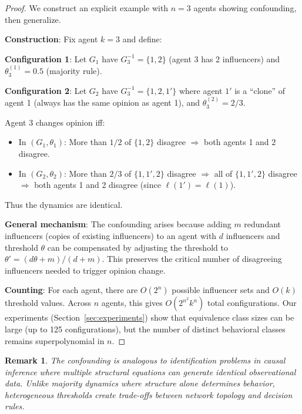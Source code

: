 \documentclass[11pt]{article}
\newtheorem{remark}{Remark}
\begin{document}
\begin{proof}
We construct an explicit example with $n=3$ agents showing confounding, then generalize.

\textbf{Construction}: Fix agent $k=3$ and define:

\textbf{Configuration 1}: Let $G_1$ have $G_{3}^{-1} = \{1,2\}$ (agent 3 has 2 influencers) and $\theta_3^{(1)} = 0.5$ (majority rule).

\textbf{Configuration 2}: Let $G_2$ have $G_{3}^{-1} = \{1,2,1'\}$ where agent $1'$ is a ``clone'' of agent 1 (always has the same opinion as agent 1), and $\theta_3^{(2)} = 2/3$.

Agent 3 changes opinion iff:
\begin{itemize}
\item In $(G_1, \theta_1)$: More than $1/2$ of $\{1,2\}$ disagree $\Rightarrow$ both agents 1 and 2 disagree.
\item In $(G_2, \theta_2)$: More than $2/3$ of $\{1,1',2\}$ disagree $\Rightarrow$ all of $\{1,1',2\}$ disagree $\Rightarrow$ both agents 1 and 2 disagree (since $\ell(1') = \ell(1)$).
\end{itemize}

Thus the dynamics are identical.

\textbf{General mechanism}: The confounding arises because adding $m$ redundant influencers (copies of existing influencers) to an agent with $d$ influencers and threshold $\theta$ can be compensated by adjusting the threshold to $\theta' = (d \theta + m)/(d + m)$. This preserves the critical number of disagreeing influencers needed to trigger opinion change.

\textbf{Counting}: For each agent, there are $O(2^n)$ possible influencer sets and $O(k)$ threshold values. Across $n$ agents, this gives $O(2^{n^2} k^n)$ total configurations. Our experiments (Section~\ref{sec:experiments}) show that equivalence class sizes can be large (up to 125 configurations), but the number of distinct behavioral classes remains superpolynomial in $n$.
\end{proof}

\begin{remark}
The confounding is analogous to identification problems in causal inference where multiple structural equations can generate identical observational data. Unlike majority dynamics where structure alone determines behavior, heterogeneous thresholds create trade-offs between network topology and decision rules.
\end{remark}
\end{document}
